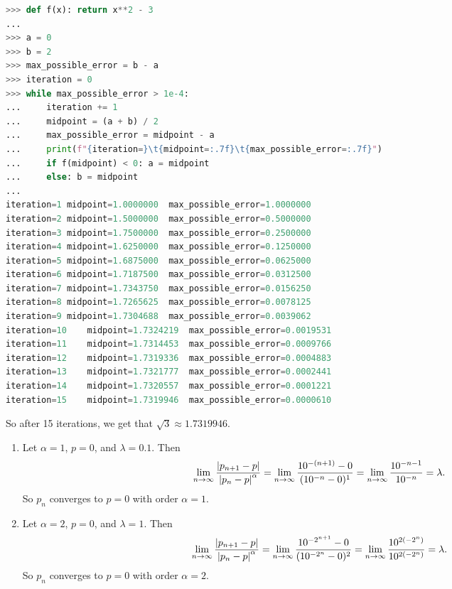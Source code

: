 \documentclass{article}
\begin{document}
\begin{lstlisting}[language=Python]
>>> def f(x): return x**2 - 3
... 
>>> a = 0
>>> b = 2
>>> max_possible_error = b - a
>>> iteration = 0
>>> while max_possible_error > 1e-4:
...     iteration += 1
...     midpoint = (a + b) / 2
...     max_possible_error = midpoint - a
...     print(f"{iteration=}\t{midpoint=:.7f}\t{max_possible_error=:.7f}")
...     if f(midpoint) < 0: a = midpoint
...     else: b = midpoint
... 
iteration=1	midpoint=1.0000000	max_possible_error=1.0000000
iteration=2	midpoint=1.5000000	max_possible_error=0.5000000
iteration=3	midpoint=1.7500000	max_possible_error=0.2500000
iteration=4	midpoint=1.6250000	max_possible_error=0.1250000
iteration=5	midpoint=1.6875000	max_possible_error=0.0625000
iteration=6	midpoint=1.7187500	max_possible_error=0.0312500
iteration=7	midpoint=1.7343750	max_possible_error=0.0156250
iteration=8	midpoint=1.7265625	max_possible_error=0.0078125
iteration=9	midpoint=1.7304688	max_possible_error=0.0039062
iteration=10	midpoint=1.7324219	max_possible_error=0.0019531
iteration=11	midpoint=1.7314453	max_possible_error=0.0009766
iteration=12	midpoint=1.7319336	max_possible_error=0.0004883
iteration=13	midpoint=1.7321777	max_possible_error=0.0002441
iteration=14	midpoint=1.7320557	max_possible_error=0.0001221
iteration=15	midpoint=1.7319946	max_possible_error=0.0000610
\end{lstlisting}
So after 15 iterations, we get that $\sqrt{3} \approx 1.7319946$.

\bigskip
\begin{prob}
\end{prob}
\begin{enumerate}[label=(\alph*)]
    \item Let $\alpha = 1$, $p=0$, and $\lambda=0.1$. Then
        \[ \lim_{n \rightarrow \infty} \frac{\left\lvert p_{n+1}-p \right\rvert}{\left\lvert p_n-p \right\rvert^\alpha} = \lim_{n \rightarrow \infty} \frac{10^{-(n+1)} - 0}{(10^{-n}-0)^1} = \lim_{n \rightarrow \infty} \frac{10^{-n-1}}{10^{-n}} = \lambda. \]
        So $p_n$ converges to $p=0$ with order $\alpha = 1$.
    \item Let $\alpha = 2$, $p=0$, and $\lambda=1$. Then
        \[ \lim_{n \rightarrow \infty} \frac{\left\lvert p_{n+1}-p \right\rvert}{\left\lvert p_n-p \right\rvert^\alpha} = \lim_{n \rightarrow \infty} \frac{10^{-2^{n+1}} - 0}{(10^{-2^n}-0)^2} = \lim_{n \rightarrow \infty} \frac{10^{2(-2^n)}}{10^{2(-2^n)}} = \lambda. \]
        So $p_n$ converges to $p=0$ with order $\alpha = 2$.
\end{enumerate}
\end{document}
